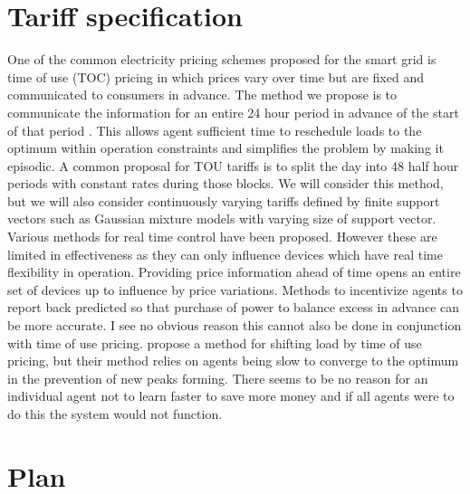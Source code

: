 \documentclass[11pt]{article}
\begin{document}

\section{Tariff specification}
One of the common electricity pricing schemes proposed for the smart grid is
time of use (TOC) pricing in which prices vary over time but are fixed and
communicated to consumers in advance. The method we propose is to communicate the information for an entire 24 hour period in advance of the start
of that period . This allows agent sufficient time to reschedule loads to the
optimum within operation constraints and simplifies the problem by making it
episodic.
A common proposal for TOU tariffs is to split the day into 48 half hour
periods with constant rates during those blocks. We will consider this method,
but we will also consider continuously varying tariffs defined by finite support
vectors such as Gaussian mixture models with varying size of support vector.
Various methods for real time control have been proposed. However these
are limited in effectiveness as they can only influence devices which have real
time flexibility in operation. Providing price information ahead of time opens an
entire set of devices up to influence by price variations. Methods to incentivize
agents to report back predicted so that purchase of power to balance excess in
advance can be more accurate. I see no obvious reason this cannot also be done
in conjunction with time of use pricing. \cite{ramchurn2011agent} propose a method for shifting
load by time of use pricing, but their method relies on agents being slow to
converge to the optimum in the prevention of new peaks forming. There seems
to be no reason for an individual agent not to learn faster to save more money
and if all agents were to do this the system would not function.


\section{Plan}
\end{document}
